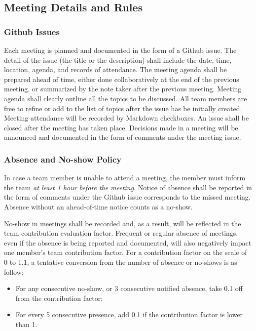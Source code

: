 \documentclass{article}
\begin{document}
\subsection{Meeting Details and Rules}

\subsubsection{Github Issues}

Each meeting is planned and documented in the form of a Github issue. The detail
of the issue (the title or the description) shall include the date, time,
location, agenda, and records of attendance. The meeting agenda shall be
prepared ahead of time, either done collaboratively at the end of the previous
meeting, or summarized by the note taker after the previous meeting. Meeting
agenda shall clearly outline all the topics to be discussed. All team members
are free to refine or add to the list of topics after the issue has be initially
created. Meeting attendance will be recorded by Markdown checkboxes. An issue
shall be closed after the meeting has taken place. Decisions made in a meeting
will be announced and documented in the form of comments under the meeting
issue.

\subsubsection{Absence and No-show Policy}

In case a team member is unable to attend a meeting, the member must inform the
team \emph{at least 1 hour before the meeting}. Notice of absence shall be
reported in the form of comments under the Github issue corresponds to the
missed meeting. Absence without an ahead-of-time notice counts as a no-show.

No-show in meetings shall be recorded and, as a result, will be reflected in the
team contribution evaluation factor. Frequent or regular absence of meetings,
even if the absence is being reported and documented, will also negatively
impact one member's team contribution factor. For a contribution factor on the
scale of 0 to 1.1, a tentative conversion from the number of absence or no-shows
is as follow:
\begin{itemize}
\item For any consecutive no-show, or 3 consecutive notified absence, take 0.1 off
  from the contribution factor;
\item For every 5 consecutive presence, add 0.1 if the contribution factor is lower
  than 1.
\end{itemize}
\end{document}
